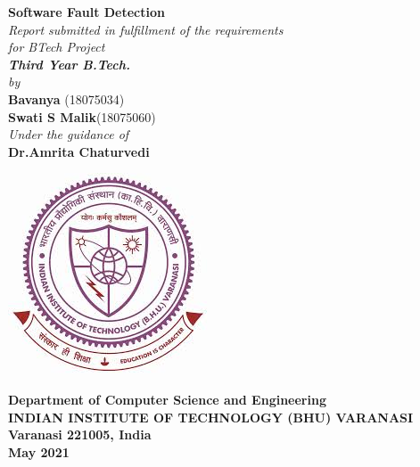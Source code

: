 \begin{titlepage}
\thispagestyle{empty}
\mbox{}
\begin{center}
\textbf{\Huge Software Fault Detection}
\textheight 15.5in \textwidth 12.5in \\[9ex]
\emph{Report submitted in fulfillment of the requirements\\
for BTech Project\\
[2ex]\large \bf Third Year B.Tech.
}\\
[2ex] \emph{by} \\[2ex]

\textbf{\large Bavanya }{(18075034)}\\[1ex]
\textbf {\large Swati S Malik}{(18075060)}\\ [5ex] 
\emph{Under the guidance of}\\[1ex]
\textbf{\large Dr.Amrita Chaturvedi} \\[7ex]


\vspace{.05in}
\begin{center}
 \includegraphics[scale=.7,keepaspectratio=true]{./logo.jpeg}
\end{center}
% 

\vspace{1cm}
{\small  \bf Department of Computer Science and Engineering}  \\[1ex]
{\small \bf{INDIAN INSTITUTE OF TECHNOLOGY (BHU) VARANASI \\
Varanasi 221005, India\\
  May 2021}}

\end{center}
\end{titlepage}
